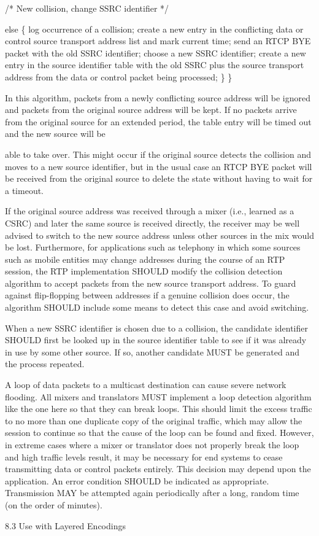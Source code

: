 \documentclass{article}
\begin{document}
\begin{itemize}
/* New collision, change SSRC identifier */

else \{ log occurrence of a collision; create a new entry in the conflicting data or control source transport address list and mark current time; send an RTCP BYE packet with the old SSRC identifier; choose a new SSRC identifier; create a new entry in the source identifier table with the old SSRC plus the source transport address from the data or control packet being processed; \} \}

In this algorithm, packets from a newly conflicting source address will be ignored and packets from the original source address will be kept.  If no packets arrive from the original source for an extended period, the table entry will be timed out and the new source will be

able to take over.  This might occur if the original source detects the collision and moves to a new source identifier, but in the usual case an RTCP BYE packet will be received from the original source to delete the state without having to wait for a timeout.

If the original source address was received through a mixer (i.e., learned as a CSRC) and later the same source is received directly, the receiver may be well advised to switch to the new source address unless other sources in the mix would be lost.  Furthermore, for applications such as telephony in which some sources such as mobile entities may change addresses during the course of an RTP session, the RTP implementation SHOULD modify the collision detection algorithm to accept packets from the new source transport address. To guard against flip-flopping between addresses if a genuine collision does occur, the algorithm SHOULD include some means to detect this case and avoid switching.

When a new SSRC identifier is chosen due to a collision, the candidate identifier SHOULD first be looked up in the source identifier table to see if it was already in use by some other source.  If so, another candidate MUST be generated and the process repeated.

A loop of data packets to a multicast destination can cause severe network flooding.  All mixers and translators MUST implement a loop detection algorithm like the one here so that they can break loops. This should limit the excess traffic to no more than one duplicate copy of the original traffic, which may allow the session to continue so that the cause of the loop can be found and fixed.  However, in extreme cases where a mixer or translator does not properly break the loop and high traffic levels result, it may be necessary for end systems to cease transmitting data or control packets entirely.  This decision may depend upon the application.  An error condition SHOULD be indicated as appropriate.  Transmission MAY be attempted again periodically after a long, random time (on the order of minutes).

\end{itemize}
8.3 Use with Layered Encodings
\end{document}
